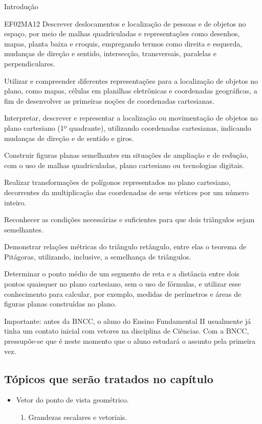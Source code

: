 \begin{apresentacao}{Introdução}
\begin{habilities}{EF02MA12}
 Descrever deslocamentos e localização de pessoas e de objetos no espaço, por meio de malhas quadriculadas e representações como desenhos, mapas, planta baixa e croquis, empregando termos como direita e esquerda, mudanças de direção e sentido, intersecção, transversais, paralelas e perpendiculares.

 Utilizar e compreender diferentes representações para a localização de objetos no plano, como mapas, células em planilhas eletrônicas e coordenadas geográficas, a fim de desenvolver as primeiras noções de coordenadas cartesianas.

 Interpretar, descrever e representar a localização ou movimentação de objetos no plano cartesiano (1º quadrante), utilizando coordenadas cartesianas, indicando mudanças de direção e de sentido e giros.

 Construir figuras planas semelhantes em situações de ampliação e de redução, com o uso de malhas quadriculadas, plano cartesiano ou tecnologias digitais.

 Realizar transformações de polígonos representados no plano cartesiano, decorrentes da multiplicação das coordenadas de seus vértices por um número inteiro.

 Reconhecer as condições necessárias e suficientes para que dois triângulos sejam semelhantes.

 Demonstrar relações métricas do triângulo retângulo, entre elas o teorema de Pitágoras, utilizando, inclusive, a semelhança de triângulos.

 Determinar o ponto médio de um segmento de reta e a distância entre dois pontos quaisquer no plano cartesiano, sem o uso de fórmulas, e utilizar esse conhecimento para calcular, por exemplo, medidas de perímetros e áreas de figuras planas construídas no plano.

\end{habilities}

Importante: antes da BNCC, o aluno do Ensino Fundamental II usualmente já tinha um contato inicial com vetores na disciplina de Ciências. Com a BNCC, pressupõe-se que é neste momento que o aluno estudará o assunto pela primeira vez.

\subsection{Tópicos que serão tratados no capítulo}
\begin{itemize}
\item {} 
Vetor do ponto de vista geométrico.
\begin{enumerate}
\item {} 
Grandezas escalares e vetoriais.


\end{enumerate}
\end{itemize}
\end{apresentacao}

